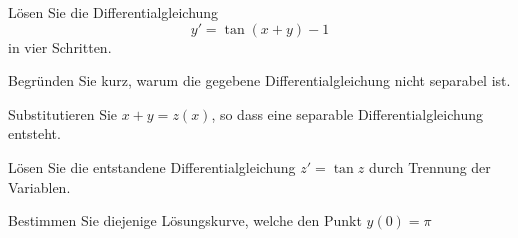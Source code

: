 \begin{atiTask}[
	title=Trennung der Variablen
]
	Lösen Sie die Differentialgleichung
	\begin{equation*}
		y'=\tan (x+y)-1
	\end{equation*}
	in vier Schritten.
	\begin{atiSubtasks}
		\item Begründen Sie kurz, warum die gegebene Differentialgleichung nicht separabel ist.
		\item Substitutieren Sie $x+y=z(x)$, so dass eine separable Differentialgleichung entsteht.
		\item Lösen Sie die entstandene Differentialgleichung $z'=\tan z$ durch Trennung der Variablen.
		\item Bestimmen Sie diejenige Lösungskurve, welche den Punkt $y(0)=\pi$
	\end{atiSubtasks}
	
\end{atiTask}
	